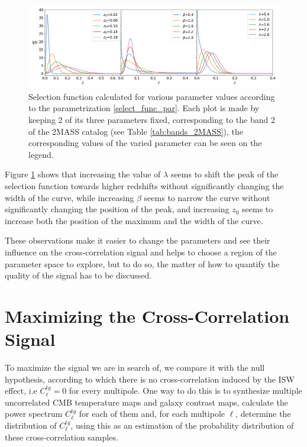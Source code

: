 \documentclass[openany,a4paper,12pt,oneside]{book}
\begin{document}
\begin{spacing}{1.5}
\begin{figure}[!htb]
	\centering
	\includegraphics[width=\linewidth]{Imagens/Selection_TriplePlot.png}
	\caption{Selection function calculated for various parameter values according to the parametrization \eqref{select_func_par}. Each plot is made by keeping 2 of its three parameters fixed, corresponding to the band 2 of the 2MASS catalog (see Table \ref{tab:bands_2MASS}), the corresponding values of the varied parameter can be seen on the legend.}
	\label{fig:selection_tripleplot}
\end{figure}

Figure \ref{fig:selection_tripleplot} shows that increasing the value of $\lambda$ seems to shift the peak of the selection function towards higher redshifts without significantly changing the width of the curve, while increasing $\beta$ seems to narrow the curve without significantly changing the position of the peak, and increasing $z_0$ seems to increase both the position of the maximum and the width of the curve. 

These observations make it easier to change the parameters and see their influence on the cross-correlation signal and helps to choose a region of the parameter space to explore, but to do so, the matter of how to quantify the quality of the signal has to be discussed.

\section{Maximizing the Cross-Correlation Signal}

To maximize the signal we are in search of, we compare it with the null hypothesis, according to which there is no cross-correlation induced by the ISW effect, i.e $C^{tg}_\ell=0$ for every multipole. One way to do this is to synthesize multiple uncorrelated CMB temperature maps and galaxy contrast maps, calculate the power spectrum $C^{tg}_\ell$ for each of them and, for each multipole $\ell$, determine the distribution of $C^{tg}_\ell$, using this as an estimation of the probability distribution of these cross-correlation samples.


\end{spacing}
\end{document}
